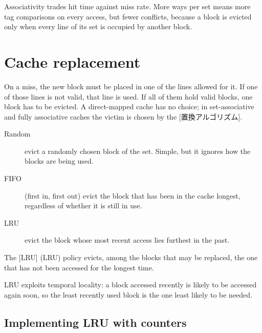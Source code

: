 \documentclass[../main.tex]{subfiles}
\begin{document}
\begin{keypoint}
  Associativity trades hit time against miss rate.  More ways per set means
  more tag comparisons on every access, but fewer conflicts, because a block
  is evicted only when every line of its set is occupied by another block.
\end{keypoint}

\section{Cache replacement}
\label{sec:l12-replacement}

On a miss, the new block must be placed in one of the lines allowed for
it.  If one of those lines is
not valid, that line is used.  If all of them hold valid blocks, one block
has to be evicted.  A direct-mapped cache has no choice; in set-associative
and fully associative caches the victim is chosen by the
[置換アルゴリズム].
\begin{description}
  \item[Random] evict a randomly chosen block of the set.  Simple, but it
    ignores how the blocks are being used.
  \item[FIFO] (first in, first out) evict the block that has been in the
    cache longest, regardless of whether it is still in use.
  \item[LRU] evict the block whose most recent access lies furthest in the
    past.
\end{description}

\begin{definition}
  The [LRU]
  (LRU) policy evicts, among the blocks that may be replaced, the one that
  has not been accessed for the longest time.
\end{definition}

LRU exploits temporal locality: a block accessed recently is likely to be
accessed again soon, so the least recently used block is the one least likely
to be needed.

\subsection{Implementing LRU with counters}
\end{document}
